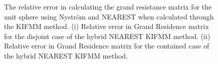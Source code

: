 \begin{figure}[ht!]
 \centering
 \hfill
 \caption[The relative error in calculating the grand resistance matrix for the unit sphere using Nyström and NEAREST when calculated through the KIFMM method.]{The relative error in calculating the grand resistance matrix for the unit sphere using Nyström and NEAREST when calculated through the KIFMM method. (i) Relative error in Grand Residence matrix for the disjoint case of the hybrid NEAREST KIFMM method. (ii) Relative error in Grand Residence matrix for the contained case of the hybrid NEAREST KIFMM method.}
 \label{fig:NEARESTCOMPFMM}
\end{figure}